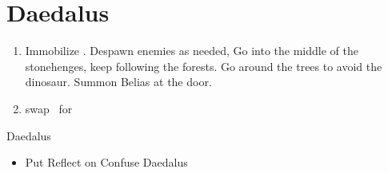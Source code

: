 \chapter{Daedalus}

\begin{enumerate}
\item Immobilize \penelo. Despawn enemies as needed, Go into the middle of the stonehenges, keep following the forests. Go around the trees to avoid the dinosaur. Summon Belias at the door.
\item swap \vaan\ for \balthier
\end{enumerate}
\begin{gambit}
\begin{itemize}
\end{itemize}
\end{gambit}
\begin{battle}{Daedalus}
\begin{itemize}
\item Put Reflect on \balthier
\balthierf Confuse Daedalus
\end{itemize}
\end{battle}